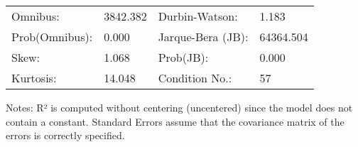 \begin{table}
\begin{center}
\begin{tabular}{llll}
\hline
Omnibus:       & 3842.382 & Durbin-Watson:    & 1.183      \\
Prob(Omnibus): & 0.000    & Jarque-Bera (JB): & 64364.504  \\
Skew:          & 1.068    & Prob(JB):         & 0.000      \\
Kurtosis:      & 14.048   & Condition No.:    & 57         \\
\hline
\end{tabular}
\end{center}
\end{table}
\bigskip
Notes: \newline 
[1] R² is computed without centering (uncentered) since the                 model does not contain a constant. \newline 
[2] Standard Errors assume that the covariance matrix of the errors is correctly specified.